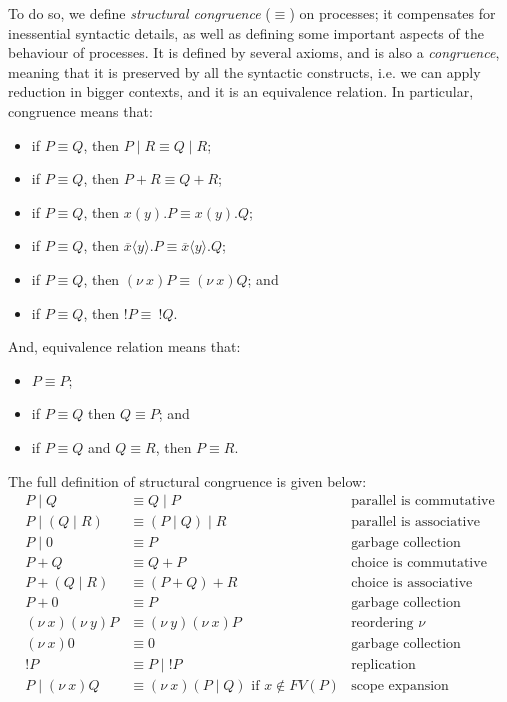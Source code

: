\documentclass[a4paper, openany]{memoir}
\theoremstyle{definition}
\begin{document}
    To do so, we define \emph{structural congruence} ($\equiv$) on processes; it compensates for inessential syntactic details, as well as defining some important aspects of the behaviour of processes. It is defined by several axioms, and is also a \emph{congruence}, meaning that it is preserved by all the syntactic constructs, i.e. we can apply reduction in bigger contexts, and it is an equivalence relation. In particular, congruence means that:
    \begin{itemize}
        \item if $P \equiv Q$, then $P \mid R \equiv Q \mid R$;
        \item if $P \equiv Q$, then $P + R \equiv Q + R$;
        \item if $P \equiv Q$, then $x(y).P \equiv x(y).Q$;
        \item if $P \equiv Q$, then $\overline{x}\langle y\rangle.P \equiv \overline{x}\langle y\rangle.Q$;
        \item if $P \equiv Q$, then $(\nu \ x)P \equiv (\nu \ x)Q$; and
        \item if $P \equiv Q$, then $!P \equiv \ !Q$.
    \end{itemize}
    And, equivalence relation means that:
    \begin{itemize}
        \item $P \equiv P$;
        \item if $P \equiv Q$ then $Q \equiv P$; and 
        \item if $P \equiv Q$ and $Q \equiv R$, then $P \equiv R$.
    \end{itemize}
    The full definition of structural congruence is given below:
    \begin{align*}
        P \mid Q &\equiv Q \mid P & \textrm{parallel is commutative} \\
        P \mid (Q \mid R) &\equiv (P \mid Q) \mid R & \textrm{parallel is associative} \\
        P \mid 0 &\equiv P & \textrm{garbage collection} \\
        P + Q &\equiv Q + P & \textrm{choice is commutative} \\
        P + (Q \mid R) &\equiv (P + Q) + R & \textrm{choice is associative} \\
        P + 0 &\equiv P & \textrm{garbage collection} \\
        (\nu \ x)(\nu \ y)P &\equiv (\nu \ y)(\nu \ x)P & \textrm{reordering } \nu \\
        (\nu \ x)0 &\equiv 0 & \textrm{garbage collection} \\
        !P &\equiv P \mid !P & \textrm{replication} \\
        P \mid (\nu \ x) Q &\equiv (\nu \ x)(P \mid Q) \textrm{ if } x \not\in FV(P) & \textrm{scope expansion}
    \end{align*}
\end{document}
